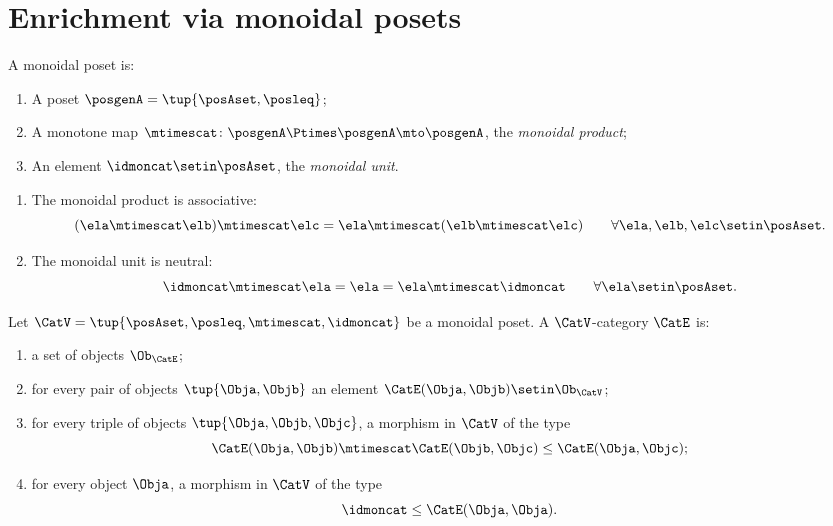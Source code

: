 
\section{Enrichment via monoidal posets}
\label{sec:quantale-enrichment}

\begin{ctdefinition}
\label{def:monoidal-poset-again}
A monoidal poset is: 

\constit
\begin{enumerate}
\item A poset $\posgenA = \tup{\posAset, \posleq}$;
\item A monotone map $\mtimescat \colon \posgenA \Ptimes \posgenA \mto \posgenA$, the \emph{monoidal product}; 
\item An element $\idmoncat \setin \posAset$, the \emph{monoidal unit}. 
\end{enumerate}

\condit
\begin{enumerate}
\item The monoidal product is associative: 
\begin{equation}
(\ela \mtimescat \elb) \mtimescat \elc = \ela \mtimescat (\elb \mtimescat \elc) \qquad \forall \ela, \elb, \elc \setin \posAset.
\end{equation}
\item The monoidal unit is neutral:
\begin{equation}
\idmoncat \mtimescat \ela = \ela = \ela \mtimescat \idmoncat \qquad \forall \ela \setin \posAset.
\end{equation}
 
\end{enumerate}


\end{ctdefinition}


\begin{ctdefinition}
\label{def:enriched-cat-monoidal-poset}
Let $\CatV = \tup{\posAset, \posleq, \mtimescat, \idmoncat}$ be a monoidal poset. A $\CatV$-category $\CatE$ is:

\constit
\begin{enumerate}
\item a set of objects $\Ob_\CatE$; 
\item for every pair of objects $\tup{\Obja, \Objb}$ an element $\CatE(\Obja, \Objb) \setin \Ob_\CatV$; 
\item for every triple of objects $\tup{\Obja, \Objb, \Objc}$, a morphism in $\CatV$ of the type
\begin{equation}
\CatE(\Obja, \Objb) \mtimescat \CatE(\Objb, \Objc) \leq \CatE(\Obja, \Objc);
\end{equation}
\item for every object $\Obja$, a morphism in $\CatV$ of the type
\begin{equation}
\idmoncat \leq \CatE(\Obja, \Obja).
\end{equation}
\end{enumerate}
\end{ctdefinition}

